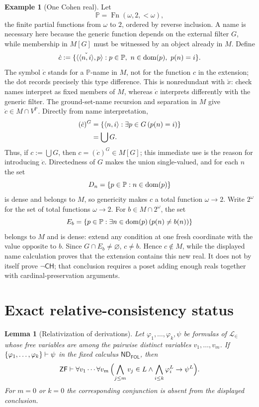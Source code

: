 \documentclass[11pt,oneside,openany]{book}
\theoremstyle{definition}
\newtheorem{example}[definition]{Example}
\theoremstyle{plain}
\newtheorem{lemma}[definition]{Lemma}
\theoremstyle{remark}
\DeclarePairedDelimiter{\set}{\lbrace}{\rbrace}
\DeclarePairedDelimiter{\angles}{\langle}{\rangle}
\newcommand{\Lang}{\mathcal{L}}
\newcommand{\dom}{\operatorname{dom}}
\newcommand{\derives}{\vdash}
\newcommand{\ND}{\mathsf{ND}}
\newcommand{\ZF}{\mathsf{ZF}}
\newcommand{\FOL}{\mathsf{FOL}}
\newcommand{\tuple}[1]{\angles{#1}}
\newcommand{\defeq}{\mathrel{:=}}
\begin{document}
\begin{example}[One Cohen real]
Let
\[
  \mathbb P=\operatorname{Fn}(\omega,2,{<}\omega),
\]
the finite partial functions from \(\omega\) to \(2\), ordered by reverse
inclusion.  A name is necessary here because the generic function depends on
the external filter \(G\), while membership in \(M[G]\) must be witnessed by
an object already in \(M\).  Define
\[
  \dot c\defeq
  \set{
    \tuple{\check{\tuple{n,i}},p}:
    p\in\mathbb P,\ n\in\dom(p),\ p(n)=i
  }.
\]
The symbol \(\dot c\) stands for a \(\mathbb P\)-name in \(M\), not for the
function \(c\) in the extension; the dot records precisely this type
difference.  This is nonredundant with \(\check x\): check names interpret as
fixed members of \(M\), whereas \(\dot c\) interprets differently with the generic
filter.  The ground-set-name recursion and separation in \(M\) give
\(\dot c\in M\cap V^{\mathbb P}\).  Directly from name interpretation,
\[
\begin{aligned}
  (\dot c)^G
    &=\set{\tuple{n,i}:\exists p\in G\,(p(n)=i)}\\
    &=\bigcup G.
\end{aligned}
\]
Thus, if \(c\defeq\bigcup G\), then \(c=(\dot c)^G\in M[G]\); this immediate
use is the reason for introducing \(\dot c\).  Directedness
of \(G\) makes the union single-valued, and for each \(n\) the set
\[
  D_n=\set{p\in\mathbb P:n\in\dom(p)}
\]
is dense and belongs to \(M\), so genericity makes \(c\) a total function
\(\omega\to2\).  Write \(2^\omega\) for the set of total functions
\(\omega\to2\).  For \(b\in M\cap2^\omega\), the set
\[
  E_b=\set{p\in\mathbb P:
            \exists n\in\dom(p)\,(p(n)\ne b(n))}
\]
belongs to \(M\) and is dense: extend any condition at one fresh coordinate
with the value opposite to \(b\).  Since \(G\cap E_b\ne\varnothing\),
\(c\ne b\).  Hence \(c\notin M\), while the displayed name calculation proves
that the extension contains this new real.  It does not by itself prove
\(\neg\mathsf{CH}\);
that conclusion requires a poset adding enough reals together with
cardinal-preservation arguments.
\end{example}

\section{Exact relative-consistency status}
\label{sec:constructibility-forcing-03}

\begin{lemma}[Relativization of derivations]
\label{lem:relativization-derivations}
Let \(\varphi_1,\ldots,\varphi_k,\psi\) be formulas of \(\Lang_{\in}\) whose
free variables are among the pairwise distinct variables
\(v_1,\ldots,v_m\).  If \(\set{\varphi_1,\ldots,\varphi_k}\derives\psi\) in
the fixed calculus \(\ND_{\FOL}\), then
\[
  \ZF\derives
  \forall v_1\cdots\forall v_m\,
  \Bigl(
    \bigwedge_{j\leq m}v_j\in L
    \land
    \bigwedge_{i\leq k}\varphi_i^{L}
    \to\psi^{L}
  \Bigr).
\]
For \(m=0\) or \(k=0\) the corresponding conjunction is absent from the
displayed conclusion.
\end{lemma}
\end{document}
